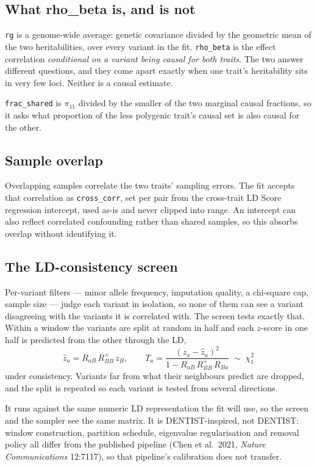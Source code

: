 \subsection*{What rho\_beta is, and is not}

\texttt{rg} is a genome-wide average: genetic covariance divided by the
geometric mean of the two heritabilities, over every variant in the fit.
\texttt{rho\_beta} is the effect correlation \emph{conditional on a variant
being causal for both traits}. The two answer different questions, and they come
apart exactly when one trait's heritability sits in very few loci. Neither is a
causal estimate.

\texttt{frac\_shared} is $\pi_{11}$ divided by the smaller of the two marginal
causal fractions, so it asks what proportion of the less polygenic trait's
causal set is also causal for the other.

\subsection*{Sample overlap}

Overlapping samples correlate the two traits' sampling errors. The fit accepts
that correlation as \texttt{cross\_corr}, set per pair from the cross-trait LD
Score regression intercept, used as-is and never clipped into range. An
intercept can also reflect correlated confounding rather than shared samples, so
this absorbs overlap without identifying it.

\subsection*{The LD-consistency screen}

Per-variant filters --- minor allele frequency, imputation quality, a
chi-square cap, sample size --- judge each variant in isolation, so none of them
can see a variant disagreeing with the variants it is correlated with. The
screen tests exactly that. Within a window the variants are split at random in
half and each $z$-score in one half is predicted from the other through the LD,
\[
  \hat{z}_a = R_{aB}\,R_{BB}^{+}\,z_B,
  \qquad
  T_a = \frac{(z_a - \hat{z}_a)^2}{1 - R_{aB}\,R_{BB}^{+}\,R_{Ba}}
  \;\sim\; \chi^2_1
\]
under consistency. Variants far from what their neighbours predict are dropped,
and the split is repeated so each variant is tested from several directions.

It runs against the same numeric LD representation the fit will use, so the
screen and the sampler see the same matrix. It is DENTIST-inspired, not DENTIST:
window construction, partition schedule, eigenvalue regularisation and removal
policy all differ from the published pipeline (Chen et al.\ 2021,
\emph{Nature Communications} 12:7117), so that pipeline's calibration does not
transfer.

